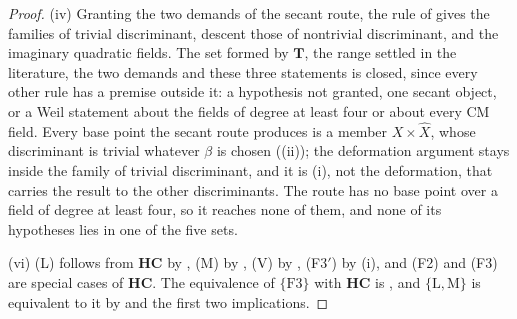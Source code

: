 \begin{proof}
(iv) Granting the two demands of the secant route, the rule of
 gives the families of trivial discriminant, descent
those of nontrivial discriminant, and  the imaginary
quadratic fields. The set formed by $\mathbf{T}$, the range settled in the
literature, the two demands and these three statements is closed, since
every other rule has a premise outside it: a hypothesis not granted, one
secant object, or a Weil statement about the fields of degree at least four
or about every CM field. Every base point the secant route produces is a
member $X\times\widehat{X}$, whose discriminant is trivial whatever $\beta$
is chosen ((ii)); the deformation argument stays inside
the family of trivial discriminant, and it is (i), not
the deformation, that carries the result to the other discriminants. The
route has no base point over a field of degree at least four, so it reaches
none of them, and none of its hypotheses lies in one of the five sets.

(vi) \textup{(L)} follows from $\mathbf{HC}$ by ,
\textup{(M)} by , \textup{(V)} by ,
(F3$'$) by (i), and (F2) and (F3) are special cases of
$\mathbf{HC}$. The equivalence of $\{\mathrm{F3}\}$ with $\mathbf{HC}$ is
, and $\{\mathrm{L},\mathrm{M}\}$ is equivalent to it by
 and the first two implications.
\end{proof}

